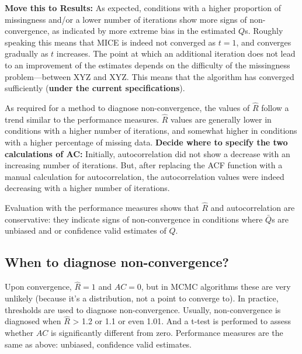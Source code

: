 \documentclass[Royal,times,sageh]{sagej}
\begin{document}
\textbf{Move this to Results:} As expected, conditions with a higher
proportion of missingness and/or a lower number of iterations show more
signs of non-convergence, as indicated by more extreme bias in the
estimated \(Q\)s. Roughly speaking this means that MICE is indeed not
converged as \(t=1\), and converges gradually as \(t\) increases. The
point at which an additional iteration does not lead to an improvement
of the estimates depends on the difficulty of the missingness
problem---between XYZ and XYZ. This means that the algorithm has
converged sufficiently (\textbf{under the current specifications}).

As required for a method to diagnose non-convergence, the values of
\(\widehat{R}\) follow a trend similar to the performance measures.
\(\widehat{R}\) values are generally lower in conditions with a higher
number of iterations, and somewhat higher in conditions with a higher
percentage of missing data. \textbf{Decide where to specify the two
calculations of AC:} Initially, autocorrelation did not show a decrease
with an increasing number of iterations. But, after replacing the ACF
function with a manual calculation for autocorrelation, the
autocorrelation values were indeed decreasing with a higher number of
iterations.

Evaluation with the performance measures shows that \(\widehat{R}\) and
autocorrelation are conservative: they indicate signs of non-convergence
in conditions where \(\bar{Q}\)s are unbiased and or confidence valid
estimates of \(Q\).

\hypertarget{when-to-diagnose-non-convergence}{%
\subsection{When to diagnose
non-convergence?}\label{when-to-diagnose-non-convergence}}

Upon convergence, \(\widehat{R}=1\) and \(AC=0\), but in MCMC algorithms
these are very unlikely (because it's a distribution, not a point to
converge to). In practice, thresholds are used to diagnose
non-convergence. Usually, non-convergence is diagnosed when
\(\widehat{R}\) \textgreater{} 1.2 or 1.1 or even 1.01. And a t-test is
performed to assess whether \(AC\) is significantly different from zero.
Performance measures are the same as above: unbiased, confidence valid
estimates.
\end{document}
